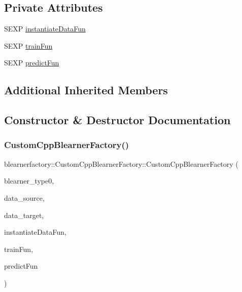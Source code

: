 \subsection*{Private Attributes}
\begin{DoxyCompactItemize}
\item 
S\+E\+XP \hyperlink{classblearnerfactory_1_1_custom_cpp_blearner_factory_aa9264dd28d1046cef3d38d531e065bc0}{instantiate\+Data\+Fun}
\item 
S\+E\+XP \hyperlink{classblearnerfactory_1_1_custom_cpp_blearner_factory_aad89a4d126b8b3e5ac0b6bca98074193}{train\+Fun}
\item 
S\+E\+XP \hyperlink{classblearnerfactory_1_1_custom_cpp_blearner_factory_aa17d2f6ba9b64a6908548b017242d24e}{predict\+Fun}
\end{DoxyCompactItemize}
\subsection*{Additional Inherited Members}


\subsection{Constructor \& Destructor Documentation}
\mbox{\label{classblearnerfactory_1_1_custom_cpp_blearner_factory_a390de0fb001434b3252e5f723c55d7b3}} 
\subsubsection{\texorpdfstring{Custom\+Cpp\+Blearner\+Factory()}{CustomCppBlearnerFactory()}}
{\footnotesize\ttfamily blearnerfactory\+::\+Custom\+Cpp\+Blearner\+Factory\+::\+Custom\+Cpp\+Blearner\+Factory (\begin{DoxyParamCaption}\item[{const std\+::string \&}]{blearner\+\_\+type0,  }\item[{\hyperlink{classdata_1_1_data}{data\+::\+Data} $\ast$}]{data\+\_\+source,  }\item[{\hyperlink{classdata_1_1_data}{data\+::\+Data} $\ast$}]{data\+\_\+target,  }\item[{S\+E\+XP}]{instantiate\+Data\+Fun,  }\item[{S\+E\+XP}]{train\+Fun,  }\item[{S\+E\+XP}]{predict\+Fun }\end{DoxyParamCaption})}


